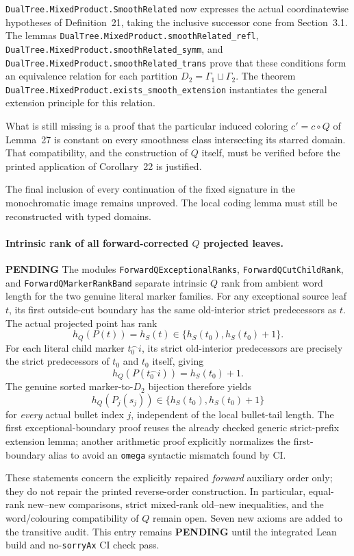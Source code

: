 \documentclass[11pt]{article}
\newcommand{\todo}{\textcolor{gray!70!black}{\textbf{PENDING}}}
\newcommand{\lean}[1]{\texttt{#1}}
\begin{document}
\lean{DualTree.MixedProduct.SmoothRelated} now expresses the actual
coordinatewise hypotheses of Definition~21, taking the inclusive successor
cone from Section~3.1.  The lemmas
\lean{DualTree.MixedProduct.smoothRelated_refl},
\lean{DualTree.MixedProduct.smoothRelated_symm}, and
\lean{DualTree.MixedProduct.smoothRelated_trans} prove that these conditions
form an equivalence relation for each partition $D_2=\Gamma_1\sqcup\Gamma_2$.
The theorem \lean{DualTree.MixedProduct.exists_smooth_extension}
instantiates the general extension principle for this relation.

What is still missing is a proof that the particular induced coloring
$c'=c\circ Q$ of Lemma~27 is constant on every smoothness class intersecting
its starred domain.  That compatibility, and the construction of $Q$ itself,
must be verified before the printed application of Corollary~22 is justified.

The final inclusion of every continuation of the fixed signature in the
monochromatic image remains unproved.  The local coding lemma must still be
reconstructed with typed domains.

\paragraph{Intrinsic rank of all forward-corrected $Q$ projected leaves.} \todo
The modules \lean{ForwardQExceptionalRanks},
\lean{ForwardQCutChildRank}, and \lean{ForwardQMarkerRankBand}
separate intrinsic $Q$ rank from ambient word length for the two
genuine literal marker families. For any exceptional source leaf $t$,
its first outside-cut boundary has the same old-interior strict
predecessors as $t$. The actual projected point has rank
\[
  h_Q(P(t))=h_S(t)\in\{h_S(t_0),h_S(t_0)+1\}.
\]
For each literal child marker $t_0^\frown i$, its strict old-interior
predecessors are precisely the strict predecessors of $t_0$ and
$t_0$ itself, giving
\[
  h_Q(P(t_0^\frown i))=h_S(t_0)+1.
\]
The genuine sorted marker-to-$D_2$ bijection therefore yields
\[
  h_Q(P_j(s_j))\in\{h_S(t_0),h_S(t_0)+1\}
\]
for \emph{every} actual bullet index $j$, independent of the local
bullet-tail length. The first exceptional-boundary proof reuses the
already checked generic strict-prefix extension lemma; another
arithmetic proof explicitly normalizes the first-boundary alias
to avoid an \texttt{omega} syntactic mismatch found by CI.

These statements concern the explicitly repaired \emph{forward}
auxiliary order only; they do not repair the printed reverse-order
construction. In particular, equal-rank new--new comparisons,
strict mixed-rank old--new inequalities, and the word/colouring
compatibility of $Q$ remain open. Seven new axioms are added to the
transitive audit. This entry remains \textbf{PENDING} until the
integrated Lean build and no-\texttt{sorryAx} CI check pass.
\end{document}
